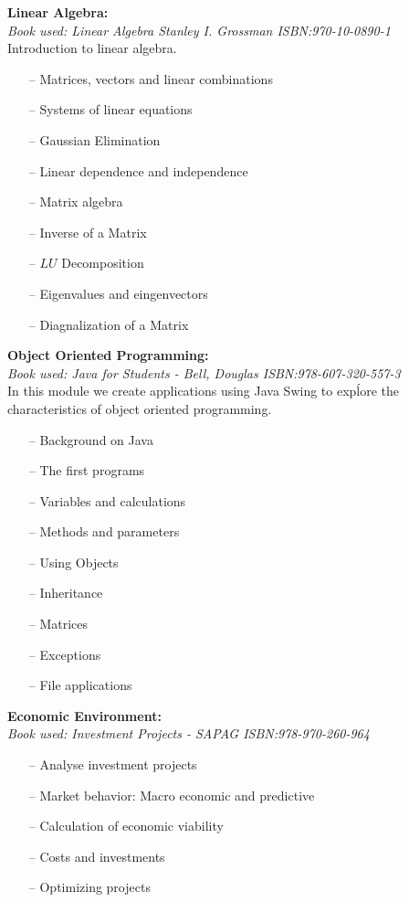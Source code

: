 \documentclass{article}
\begin{document}
\textbf{Linear Algebra:}\\
  \emph{Book used: Linear Algebra Stanley I. Grossman ISBN:970-10-0890-1}\\
  Introduction to linear algebra.
  \begin{itemize}
     \setlength\itemsep{0pt}
     \item[--]  Matrices, vectors and linear combinations
     \item[--] Systems of linear equations
     \item[--] Gaussian Elimination
     \item[--] Linear dependence and independence
     \item[--] Matrix algebra
     \item[--] Inverse of a Matrix
     \item[--] $LU$ Decomposition
     \item[--] Eigenvalues and eingenvectors
     \item[--] Diagnalization of a Matrix
  \end{itemize}
\newpage
\textbf{Object Oriented Programming:}\\
    \emph{Book used: Java for Students - Bell, Douglas    ISBN:978-607-320-557-3}\\
    In this module we create applications using Java Swing to expĺore the
    characteristics of object oriented programming.
    \begin{itemize}
     \setlength\itemsep{0pt}
        \item[--] Background on Java
        \item[--] The first programs
        \item[--] Variables and calculations
        \item[--] Methods and parameters
        \item[--] Using Objects
        \item[--] Inheritance
        \item[--] Matrices
        \item[--] Exceptions
        \item[--] File applications
    \end{itemize}

\textbf{Economic Environment:}\\
    \emph{Book used: Investment Projects - SAPAG ISBN:978-970-260-964}
    \begin{itemize}
     \setlength\itemsep{0pt}
        \item[--] Analyse investment projects
        \item[--] Market behavior: Macro economic and predictive
        \item[--] Calculation of economic viability
        \item[--] Costs and investments
        \item[--] Optimizing projects
    \end{itemize}
\end{document}

